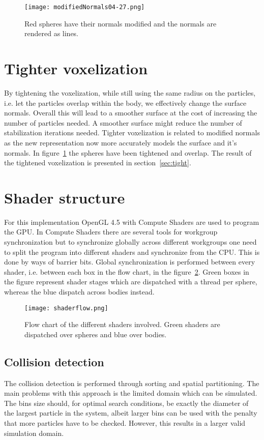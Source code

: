 \begin{figure}[H]
  \centering
  \texttt{[image: modifiedNormals04-27.png]}
  \caption{Red spheres have their normals modified and the normals are rendered as lines.}
  \label{fig:modnorm}
\end{figure}

\section{Tighter voxelization}
By tightening the voxelization, while still using the same radius on the particles,
i.e. let the particles overlap within the body, we effectively change the surface
normals. Overall this will lead to a smoother surface at the cost of increasing the number
of particles needed. A smoother surface might reduce the number of stabilization iterations needed.
Tighter voxelization is related to modified normals as the new
representation now more accurately models the surface and it's normals. In figure~\ref{fig:modnorm}
the spheres have been tightened and overlap. The result of the tightened voxelization is presented in section~\ref{sec:tight}.

\section{Shader structure}
For this implementation OpenGL 4.5 with Compute Shaders are used to program the GPU.
 In Compute Shaders there are several tools for workgroup synchronization
but to synchronize globally across different workgroups one need to split the program into
different shaders and synchronize from the CPU. This is done by ways of barrier bits. Global synchronization
is performed between every shader, i.e. between each box in the flow chart, in the figure~\ref{fig:flow}. Green
boxes in the figure represent shader stages which are dispatched with a thread per
sphere, whereas the blue dispatch across bodies instead.

\begin{figure}[H]
  \centering
  \texttt{[image: shaderflow.png]}
  \caption{Flow chart of the different shaders involved. Green shaders are dispatched over spheres and blue over bodies.}
  \label{fig:flow}
\end{figure}

\subsection{Collision detection}
The collision detection is performed through sorting and spatial partitioning.
The main problems with this approach is the limited domain which can be simulated.
The bins size should, for optimal search conditions, be exactly the diameter of the largest
particle in the system, albeit larger bins can be used with the penalty that more
particles have to be checked. However, this results in a larger valid simulation domain.

